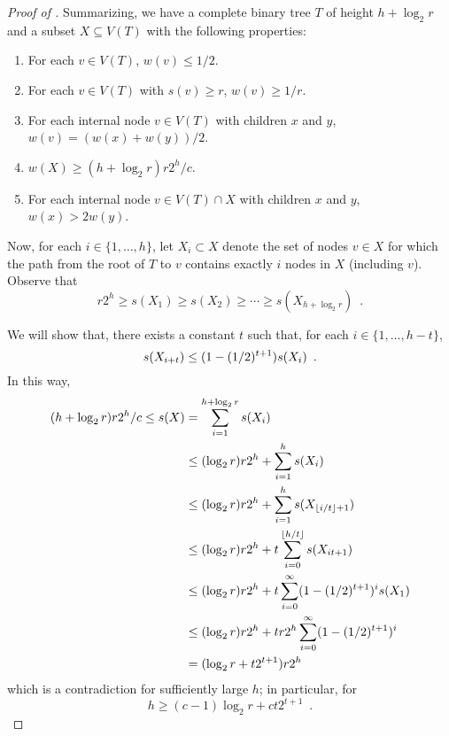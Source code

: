 \documentclass{patmorin}
\begin{document}
\begin{proof}[Proof of ]
  Summarizing, we have a complete binary tree $T$ of height $h+\log_2 r$ and
  a subset $X\subseteq V(T)$ with the following properties: 
  \begin{enumerate}
    \item For each $v\in V(T)$, $w(v) \le 1/2$.
    \item For each $v\in V(T)$ with $s(v) \ge r$, $w(v)\ge 1/r$.
    \item For each internal node $v\in V(T)$ with children $x$ and $y$,
       $w(v) = (w(x)+w(y))/2$.
    \item $w(X) \ge (h+\log_2 r)r2^{h}/c$.
     \item For each internal node $v\in V(T)\cap X$ with children $x$ and $y$,
       $w(x) > 2w(y)$.
  \end{enumerate}
  Now, for each $i\in\{1,\ldots,h\}$, let $X_i\subset X$ denote the
  set of nodes $v\in X$ for which the path from the root of $T$ to $v$
  contains exactly $i$ nodes in $X$ (including $v$).  Observe that 
  \[  r2^h \ge s(X_1) \ge s(X_2) \ge \cdots\ge s(X_{h+\log_2 r}) \enspace . \]

  We will show that, there exists a constant $t$ such that, 
  for each $i\in\{1,\ldots,h-t\}$,  
  \begin{equation}
     s(X_{i+t}) \le (1-(1/2)^{t+1}) s(X_i) \enspace . \eqlabel{t}
  \end{equation}
  In this way, 
  \begin{align*}
     (h+\log_2 r)r2^{h}/c 
        \le s(X) & = \sum_{i=1}^{h+\log_2 r} s(X_i) \\
           &\le (\log_2 r)r2^{h}+\sum_{i=1}^{h} s(X_i) \\
           &\le (\log_2 r)r2^{h}+\sum_{i=1}^{h} s(X_{{\lfloor i/t \rfloor}+1}) \\
           &\le (\log_2 r)r2^{h}+t\sum_{i=0}^{{\lfloor h/t \rfloor}} s(X_{it+1}) \\
           &\le (\log_2 r)r2^{h}+t\sum_{i=0}^{\infty} (1-(1/2)^{t+1})^i s(X_1) \\
           &\le (\log_2 r)r2^{h}+tr2^{h}\sum_{i=0}^{\infty} (1-(1/2)^{t+1})^i  \\
           & = (\log_2 r+t2^{t+1})r2^{h} 
  \end{align*}
  which is a contradiction for sufficiently large $h$; in particular, for 
  \[    
        h \ge (c-1)\log_2 r+ ct2^{t+1} \enspace . 
  \]


\end{proof}
\end{document}
